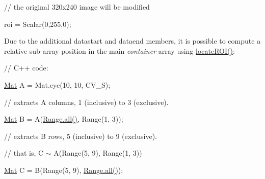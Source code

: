 {\ttfamily }

{\ttfamily }

{\ttfamily // the original 320x240 image will be modified}

{\ttfamily }

{\ttfamily }

{\ttfamily roi = Scalar(0,255,0);}

{\ttfamily }

{\ttfamily }

{\ttfamily }

Due to the additional {\ttfamily datastart} and {\ttfamily dataend} members, it is possible to compute a relative sub-\/array position in the main {\itshape container} array using {\ttfamily \mbox{\hyperlink{classorg_1_1opencv_1_1core_1_1_mat_a51784a0e99c00a52e8be330cf05710f8}{locate\+R\+O\+I()}}}\+:

{\ttfamily }

{\ttfamily }

{\ttfamily }

{\ttfamily // C++ code\+:}

{\ttfamily }

{\ttfamily }

{\ttfamily \mbox{\hyperlink{classorg_1_1opencv_1_1core_1_1_mat}{Mat}} A = Mat.\+eye(10, 10, C\+V\+\_\+S);}

{\ttfamily }

{\ttfamily }

{\ttfamily // extracts A columns, 1 (inclusive) to 3 (exclusive).}

{\ttfamily }

{\ttfamily }

{\ttfamily \mbox{\hyperlink{classorg_1_1opencv_1_1core_1_1_mat}{Mat}} B = A(\mbox{\hyperlink{classorg_1_1opencv_1_1core_1_1_range_a2dd4a07a9715665aacee5c7cdf79a175}{Range.\+all()}}, Range(1, 3));}

{\ttfamily }

{\ttfamily }

{\ttfamily // extracts B rows, 5 (inclusive) to 9 (exclusive).}

{\ttfamily }

{\ttfamily }

{\ttfamily // that is, C $\sim$ A(Range(5, 9), Range(1, 3))}

{\ttfamily }

{\ttfamily }

{\ttfamily \mbox{\hyperlink{classorg_1_1opencv_1_1core_1_1_mat}{Mat}} C = B(Range(5, 9), \mbox{\hyperlink{classorg_1_1opencv_1_1core_1_1_range_a2dd4a07a9715665aacee5c7cdf79a175}{Range.\+all()}});}

